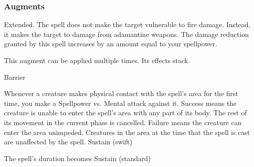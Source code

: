 \subsubsection{Augments}
 Extended.
The spell does not make the target vulnerable to fire damage.
Instead, it makes the target  to damage from adamantine weapons.
The damage reduction granted by this spell increases by an amount equal to your spellpower.
\par
This augment can be applied multiple times.
Its effects stack.
\begin{spellsection}{Barrier}
\begin{spellcontent}
\begin{spelltargetinginfo}
\end{spelltargetinginfo}
\begin{spelleffects}
\spelleffect
Whenever a creature makes physical contact with the spell's area for the first time, you make a Spellpower vs. Mental attack against it.
Success means the creature is unable to enter the spell's area with any part of its body.
The rest of its movement in the current phase is cancelled.
Failure means the creature can enter the area unimpeded.
Creatures in the area at the time that the spell is cast are unaffected by the spell.
\spelldur Sustain (swift)
\end{spelleffects}
\end{spellcontent}
\begin{spellfooter}
\miscastexplode
\end{spellfooter}
\begin{spellcantrip}
The spell's duration becomes Sustain (standard)
\end{spellcantrip}
\end{spellsection}

